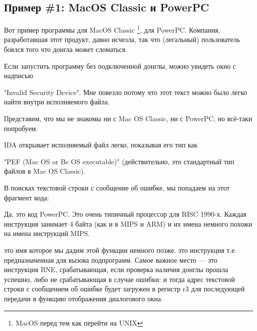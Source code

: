 \newcommand{\PPC}{\InSqBrackets{\IT{PowerPC(tm) Microprocessor Family: The Programming Environments for 32-Bit Microprocessors}, (2000)}\footnote{\AlsoAvailableAs \url{http://yurichev.com/mirrors/PowerPC/6xx_pem.pdf}}}

\newcommand{\PPCABI}{[Steve Zucker, SunSoft and Kari Karhi, IBM, \IT{SYSTEM V APPLICATION BINARY INTERFACE: PowerPC Processor Supplement}, (1995)]\footnote{\AlsoAvailableAs \url{http://yurichev.com/mirrors/PowerPC/elfspec_ppc.pdf}}}

\subsection{Пример \#1: MacOS Classic и PowerPC}

Вот пример программы для MacOS Classic
\footnote{MacOS перед тем как перейти на UNIX}, для PowerPC.
Компания, разработавшая этот продукт, давно исчезла, так что (легальный) пользователь
боялся того что донгла может сломаться.

Если запустить программу без подключенной донглы, можно увидеть окно с надписью

"Invalid Security Device".
Мне повезло потому что этот текст можно было легко найти внутри исполняемого файла.

Представим, что мы не знакомы ни с Mac OS Classic, ни с PowerPC, но всё-таки попробуем.

\ac{IDA} открывает исполняемый файл легко, показывая его тип как
 
"PEF (Mac OS or Be OS executable)" (действительно, это стандартный тип файлов в Mac OS Classic).

В поисках текстовой строки с сообщение об ошибке, мы попадаем на этот фрагмент кода:



Да, это код PowerPC.
Это очень типичный процессор для \ac{RISC} 1990-х.
Каждая инструкция занимает 4 байта (как и в MIPS и ARM) и их имена немного похожи на имена 
инструкций MIPS.

 это имя которое мы дадим этой функции немного позже.
 это инструкция  
т.е. предназначенная для вызова подпрограмм.
Самое важное место --- это инструкция \ac{BNE}, срабатывающая, если проверка наличия донглы прошла
успешно, либо не срабатывающая в случае ошибки: и тогда адрес текстовой строки с сообщением об ошибке
будет загружен в регистр r3 для последующей передачи в функцию отображения диалогового окна.

